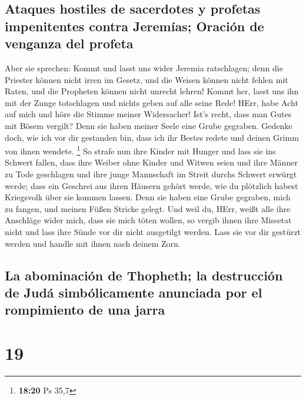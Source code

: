 \hypertarget{ataques-hostiles-de-sacerdotes-y-profetas-impenitentes-contra-jeremuxedas-oraciuxf3n-de-venganza-del-profeta}{%
\subsection{Ataques hostiles de sacerdotes y profetas impenitentes
contra Jeremías; Oración de venganza del
profeta}\label{ataques-hostiles-de-sacerdotes-y-profetas-impenitentes-contra-jeremuxedas-oraciuxf3n-de-venganza-del-profeta}}

 Aber sie sprechen: Kommt und lasst uns wider Jeremia
ratschlagen; denn die Priester können nicht irren im Gesetz, und die
Weisen können nicht fehlen mit Raten, und die Propheten können nicht
unrecht lehren! Kommt her, lasst uns ihn mit der Zunge totschlagen und
nichts geben auf alle seine Rede!  HErr, habe Acht auf
mich und höre die Stimme meiner Widersacher!  Ist's
recht, dass man Gutes mit Bösem vergilt? Denn sie haben meiner Seele
eine Grube gegraben. Gedenke doch, wie ich vor dir gestanden bin, dass
ich ihr Bestes redete und deinen Grimm von ihnen wendete. \footnote{\textbf{18:20}
  Ps 35,7}  So strafe nun ihre Kinder mit Hunger und lass
sie ins Schwert fallen, dass ihre Weiber ohne Kinder und Witwen seien
und ihre Männer zu Tode geschlagen und ihre junge Mannschaft im Streit
durchs Schwert erwürgt werde;  dass ein Geschrei aus
ihren Häusern gehört werde, wie du plötzlich habest Kriegsvolk über sie
kommen lassen. Denn sie haben eine Grube gegraben, mich zu fangen, und
meinen Füßen Stricke gelegt.  Und weil du, HErr, weißt
alle ihre Anschläge wider mich, dass sie mich töten wollen, so vergib
ihnen ihre Missetat nicht und lass ihre Sünde vor dir nicht ausgetilgt
werden. Lass sie vor dir gestürzt werden und handle mit ihnen nach
deinem Zorn.

\hypertarget{la-abominaciuxf3n-de-thopheth-la-destrucciuxf3n-de-juduxe1-simbuxf3licamente-anunciada-por-el-rompimiento-de-una-jarra}{%
\subsection{La abominación de Thopheth; la destrucción de Judá
simbólicamente anunciada por el rompimiento de una
jarra}\label{la-abominaciuxf3n-de-thopheth-la-destrucciuxf3n-de-juduxe1-simbuxf3licamente-anunciada-por-el-rompimiento-de-una-jarra}}

\hypertarget{section-18}{%
\section{19}\label{section-18}}

